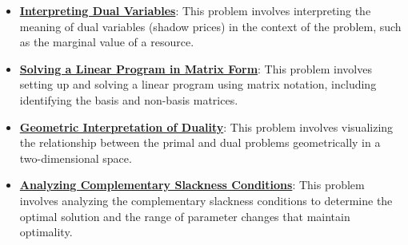 \documentclass{article}%
\begin{document}
\begin{itemize}[leftmargin=*]
\item \href{https://www.math.purdue.edu/~yipn/421/2024-12-03-Duality.pdf#page=15}{\textbf{Interpreting Dual Variables}}: This problem involves interpreting the meaning of dual variables (shadow prices) in the context of the problem, such as the marginal value of a resource.%
\item \href{https://www.math.purdue.edu/~yipn/421/2024-12-03-Duality.pdf#page=22}{\textbf{Solving a Linear Program in Matrix Form}}: This problem involves setting up and solving a linear program using matrix notation, including identifying the basis and non-basis matrices.%
\item \href{https://www.math.purdue.edu/~yipn/421/2024-12-03-Duality.pdf#page=9}{\textbf{Geometric Interpretation of Duality}}: This problem involves visualizing the relationship between the primal and dual problems geometrically in a two-dimensional space.%
\item \href{https://www.math.purdue.edu/~yipn/421/2024-12-03-Duality.pdf#page=32}{\textbf{Analyzing Complementary Slackness Conditions}}: This problem involves analyzing the complementary slackness conditions to determine the optimal solution and the range of parameter changes that maintain optimality.%
\end{itemize}

%
\end{document}
